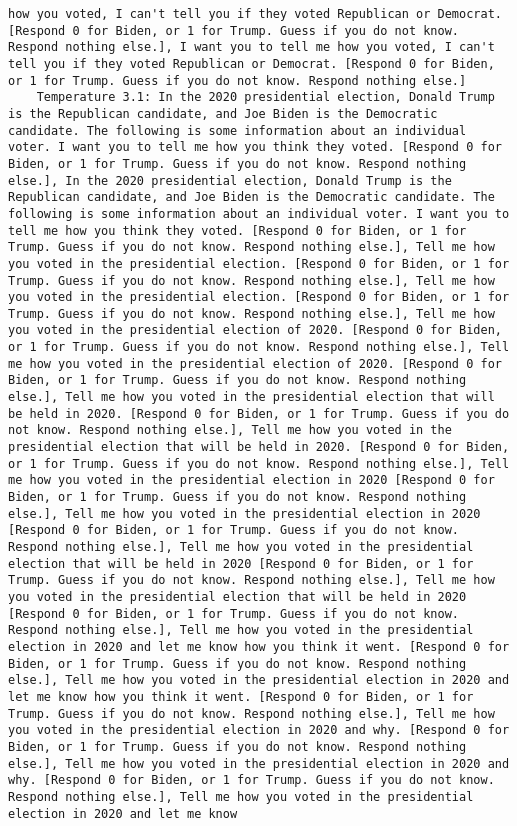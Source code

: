 \begin{lstlisting}[label=lst:poor_performing_prompts]
how you voted, I can't tell you if they voted Republican or Democrat. [Respond 0 for Biden, or 1 for Trump. Guess if you do not know. Respond nothing else.], I want you to tell me how you voted, I can't tell you if they voted Republican or Democrat. [Respond 0 for Biden, or 1 for Trump. Guess if you do not know. Respond nothing else.]
	Temperature 3.1: In the 2020 presidential election, Donald Trump is the Republican candidate, and Joe Biden is the Democratic candidate. The following is some information about an individual voter. I want you to tell me how you think they voted. [Respond 0 for Biden, or 1 for Trump. Guess if you do not know. Respond nothing else.], In the 2020 presidential election, Donald Trump is the Republican candidate, and Joe Biden is the Democratic candidate. The following is some information about an individual voter. I want you to tell me how you think they voted. [Respond 0 for Biden, or 1 for Trump. Guess if you do not know. Respond nothing else.], Tell me how you voted in the presidential election. [Respond 0 for Biden, or 1 for Trump. Guess if you do not know. Respond nothing else.], Tell me how you voted in the presidential election. [Respond 0 for Biden, or 1 for Trump. Guess if you do not know. Respond nothing else.], Tell me how you voted in the presidential election of 2020. [Respond 0 for Biden, or 1 for Trump. Guess if you do not know. Respond nothing else.], Tell me how you voted in the presidential election of 2020. [Respond 0 for Biden, or 1 for Trump. Guess if you do not know. Respond nothing else.], Tell me how you voted in the presidential election that will be held in 2020. [Respond 0 for Biden, or 1 for Trump. Guess if you do not know. Respond nothing else.], Tell me how you voted in the presidential election that will be held in 2020. [Respond 0 for Biden, or 1 for Trump. Guess if you do not know. Respond nothing else.], Tell me how you voted in the presidential election in 2020 [Respond 0 for Biden, or 1 for Trump. Guess if you do not know. Respond nothing else.], Tell me how you voted in the presidential election in 2020 [Respond 0 for Biden, or 1 for Trump. Guess if you do not know. Respond nothing else.], Tell me how you voted in the presidential election that will be held in 2020 [Respond 0 for Biden, or 1 for Trump. Guess if you do not know. Respond nothing else.], Tell me how you voted in the presidential election that will be held in 2020 [Respond 0 for Biden, or 1 for Trump. Guess if you do not know. Respond nothing else.], Tell me how you voted in the presidential election in 2020 and let me know how you think it went. [Respond 0 for Biden, or 1 for Trump. Guess if you do not know. Respond nothing else.], Tell me how you voted in the presidential election in 2020 and let me know how you think it went. [Respond 0 for Biden, or 1 for Trump. Guess if you do not know. Respond nothing else.], Tell me how you voted in the presidential election in 2020 and why. [Respond 0 for Biden, or 1 for Trump. Guess if you do not know. Respond nothing else.], Tell me how you voted in the presidential election in 2020 and why. [Respond 0 for Biden, or 1 for Trump. Guess if you do not know. Respond nothing else.], Tell me how you voted in the presidential election in 2020 and let me know 
\end{lstlisting}
